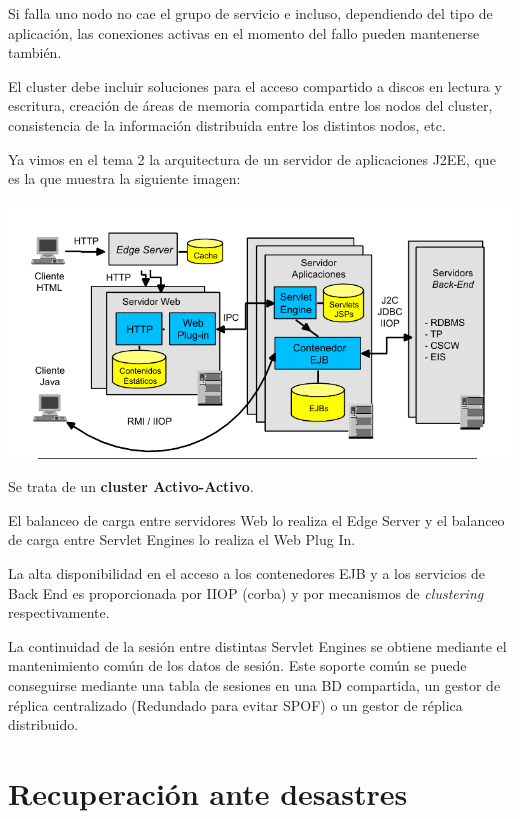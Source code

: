 \begin{enumerate}
Si falla uno nodo no cae el grupo de servicio e incluso, dependiendo del tipo de aplicación, las conexiones activas en el momento del fallo pueden mantenerse también.

El cluster debe incluir soluciones para el acceso compartido a discos en lectura y escritura, creación de áreas de memoria compartida entre los nodos del cluster, consistencia de la información distribuida entre los distintos nodos, etc.

\begin{example}
Ya vimos en el tema 2 la arquitectura de un servidor de aplicaciones J2EE, que es la que muestra la siguiente imagen:
\begin{center}
\includegraphics[width=\linewidth]{img/j2ee.png}
\end{center}

Se trata de un \textbf{cluster Activo-Activo}.

El balanceo de carga entre servidores Web lo realiza el Edge Server y el balanceo de carga entre Servlet Engines lo realiza el Web Plug In.

La alta disponibilidad en el acceso a los contenedores EJB y a los servicios de Back End es proporcionada por IIOP (corba) y por mecanismos de \textit{clustering} respectivamente.

La continuidad de la sesión entre distintas Servlet Engines se obtiene mediante el mantenimiento común de los datos de sesión. Este soporte común se puede conseguirse mediante una tabla de sesiones en una BD compartida, un gestor de réplica centralizado (Redundado para evitar SPOF) o un gestor de réplica distribuido.
\end{example}

\end{enumerate}

\section{Recuperación ante desastres}

